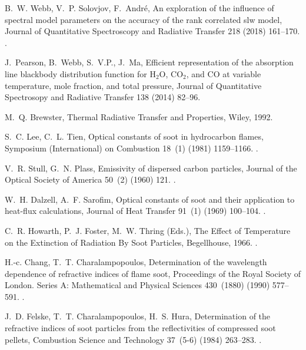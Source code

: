 \documentclass[preprint,12pt]{elsarticle}
\newcounter{bla}
\begin{document}
\begin{thebibliography}{10}
B.~W. Webb, V.~P. Solovjov, F.~Andr{\'e}, An exploration of the influence of
  spectral model parameters on the accuracy of the rank correlated slw model,
  Journal of Quantitative Spectroscopy and Radiative Transfer 218 (2018)
  161--170.
\newblock \href {http://dx.doi.org/10.1016/j.jqsrt.2018.06.023}
  {}.

J.~Pearson, B.~Webb, S.~V.P., J.~Ma, Efficient representation of the absorption
  line blackbody distribution function for {H$_2$O}, {CO$_2$}, and {CO} at
  variable temperature, mole fraction, and total pressure, Journal of
  Quantitative Spectrosopy and Radiative Transfer 138 (2014) 82--96.

M.~Q. Brewster, Thermal Radiative Transfer and Properties, Wiley, 1992.

S.~C. Lee, C.~L. Tien, Optical constants of soot in hydrocarbon flames,
  Symposium (International) on Combustion 18~(1) (1981) 1159--1166.
\newblock \href {http://dx.doi.org/10.1016/S0082-0784(81)80120-8}
  {}.

V.~R. Stull, G.~N. Plass, Emissivity of dispersed carbon particles, Journal of
  the Optical Society of America 50~(2) (1960) 121.
\newblock \href {http://dx.doi.org/10.1364/JOSA.50.000121}
  {}.

W.~H. Dalzell, A.~F. Sarofim, Optical constants of soot and their application
  to heat-flux calculations, Journal of Heat Transfer 91~(1) (1969) 100--104.
\newblock \href {http://dx.doi.org/10.1115/1.3580063}
  {}.

C.~R. Howarth, P.~J. Foster, M.~W. Thring (Eds.), The Effect of Temperature on
  the Extinction of Radiation By Soot Particles, Begellhouse, 1966.
\newblock \href {http://dx.doi.org/10.1615/IHTC3.1210}
  {}.

H.-c. Chang, T.~T. Charalampopoulos, Determination of the wavelength dependence
  of refractive indices of flame soot, Proceedings of the Royal Society of
  London. Series A: Mathematical and Physical Sciences 430~(1880) (1990)
  577--591.
\newblock \href {http://dx.doi.org/10.1098/rspa.1990.0107}
  {}.

J.~D. Felske, T.~T. Charalampopoulos, H.~S. Hura, Determination of the
  refractive indices of soot particles from the reflectivities of compressed
  soot pellets, Combustion Science and Technology 37~(5-6) (1984) 263--283.
\newblock \href {http://dx.doi.org/10.1080/00102208408923757}
  {}.


\end{thebibliography}
\end{document}
